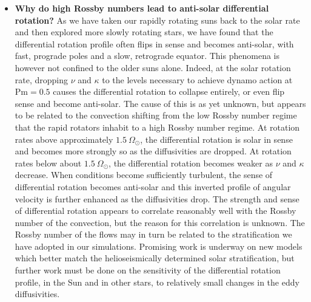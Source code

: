\begin{itemize}
   \item \textbf{Why do high Rossby numbers lead to anti-solar differential rotation?}
     As we have taken our rapidly rotating suns back to the solar rate
     and then explored more slowly rotating stars, we have found that
     the differential rotation profile often flips in sense and
     becomes anti-solar, with fast, prograde poles and a slow,
     retrograde equator.  This phenomena is however not confined to
     the older suns alone.  Indeed, at the solar rotation rate,
     dropping $\nu$ and $\kappa$ to the levels necessary to achieve
     dynamo action at $\mathrm{Pm}=0.5$ causes the differential
     rotation to collapse entirely, or even flip sense and become
     anti-solar.  The cause of this is as yet unknown, but appears to
     be related to the convection shifting from the low Rossby number
     regime that the rapid rotators inhabit to a high Rossby number
     regime.  At rotation rates above approximately
     $1.5\:\Omega_\odot$, the differential rotation is
     solar in sense and becomes more strongly so as the diffusivities
     are dropped.  At rotation rates below about $1.5\:\Omega_\odot$,
     the differential rotation becomes weaker as $\nu$ and $\kappa$
     decrease.  When conditions become sufficiently turbulent, the
     sense of differential rotation becomes anti-solar and this
     inverted profile of angular velocity is further enhanced as the
     diffusivities drop.  The strength and sense of differential
     rotation appears to correlate reasonably well with the Rossby
     number of the convection, but the reason for this correlation is unknown.
     The Rossby number of the  flows may in turn be related to the
     stratification we have adopted in our simulations.  
     Promising work is underway on new models which better match the
     helioseismically determined solar stratification, but further work
     must be done on the sensitivity of the differential rotation
     profile, in the Sun and in other stars, to relatively small
     changes in the eddy diffusivities.  
  


\end{itemize}
